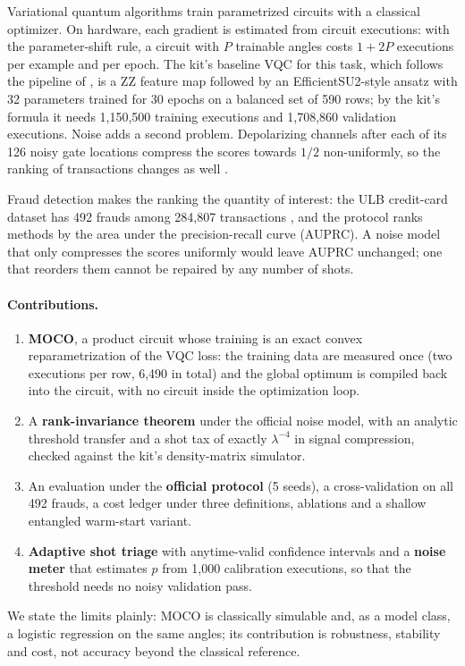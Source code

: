 \documentclass[10pt,twocolumn]{article}
\theoremstyle{definition}
\begin{document}
Variational quantum algorithms train parametrized circuits with a classical optimizer. On hardware, each
gradient is estimated from circuit executions: with the parameter-shift rule, a circuit with $P$ trainable angles costs $1+2P$ executions per example and per
epoch. The kit's baseline VQC for this task, which follows the pipeline of \citet{dinut2026}, is a ZZ feature map
followed by an EfficientSU2-style ansatz with 32 parameters trained for 30 epochs on a balanced set of 590 rows;
by the kit's formula it needs 1,150,500 training executions and 1,708,860 validation executions.
Noise adds a second problem. Depolarizing channels after each of its 126 noisy gate locations compress the
scores towards $1/2$ non-uniformly, so the ranking of transactions changes as well
\citep{dinut2026}.

Fraud detection makes the ranking the quantity of interest: the ULB credit-card dataset has 492 frauds among
284,807 transactions \citep{dalpozzolo2015}, and the protocol ranks methods by the area under the
precision-recall curve (AUPRC). A noise model that only compresses the scores uniformly would leave AUPRC
unchanged; one that reorders them cannot be repaired by any number of shots.

\paragraph{Contributions.}
\begin{enumerate}
\item \textbf{MOCO}, a product circuit whose training is an exact convex reparametrization of the VQC loss: the
training data are measured once (two executions per row, 6,490 in total) and the global optimum is compiled back
into the circuit, with no circuit inside the optimization loop.
\item A \textbf{rank-invariance theorem} under the official noise model, with an analytic threshold transfer
and a shot tax of exactly $\lambda^{-4}$ in signal compression, checked against the kit's density-matrix
simulator.
\item An evaluation under the \textbf{official protocol} (5 seeds), a cross-validation on all 492 frauds, a
cost ledger under three definitions, ablations and a shallow entangled warm-start variant.
\item \textbf{Adaptive shot triage} with anytime-valid confidence intervals and a \textbf{noise meter} that
estimates $p$ from 1,000 calibration executions, so that the threshold needs no noisy validation pass.
\end{enumerate}
We state the limits plainly: MOCO is classically simulable and, as a model class, a logistic regression on the
same angles; its contribution is robustness, stability and cost, not accuracy beyond the classical reference.
\end{document}
